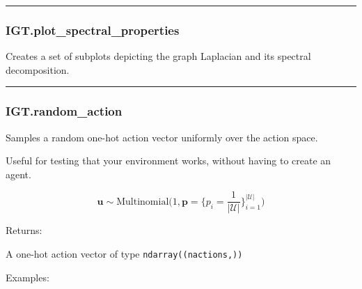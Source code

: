 \begin{center}\rule{0.5\linewidth}{\linethickness}\end{center}

\subsubsection{IGT.plot\_spectral\_properties}\label{igt.plot_spectral_properties}

\begin{Shaded}
\begin{Highlighting}[]
\OperatorTok{=}\OperatorTok{=}\OperatorTok{=}\NormalTok{)}
\end{Highlighting}
\end{Shaded}

Creates a set of subplots depicting the graph Laplacian and its spectral
decomposition.

\begin{center}\rule{0.5\linewidth}{\linethickness}\end{center}

\subsubsection{IGT.random\_action}\label{igt.random_action}

\begin{Shaded}
\begin{Highlighting}[]
\NormalTok{)}
\end{Highlighting}
\end{Shaded}

Samples a random one-hot action vector uniformly over the action space.

Useful for testing that your environment works, without having to create
an agent.

\[
\mathbf u \sim \mathrm{Multinomial}\Big(1, \mathbf p=\{p_i = \frac{1}{|\mathcal U|}\}_{i=1}^{|\mathcal U|}\Big)
\]

Returns:

A one-hot action vector of type \texttt{ndarray((nactions,))}

Examples:

\begin{Shaded}
\begin{Highlighting}[]
\OperatorTok{=}
\end{Highlighting}
\end{Shaded}

